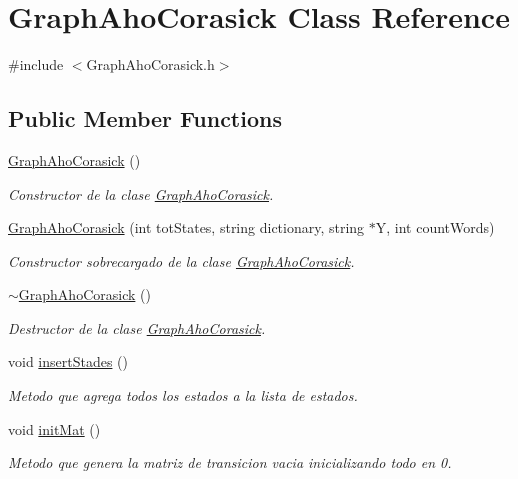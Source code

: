\hypertarget{class_graph_aho_corasick}{\section{Graph\+Aho\+Corasick Class Reference}
\label{class_graph_aho_corasick}
}


{\ttfamily \#include $<$Graph\+Aho\+Corasick.\+h$>$}

\subsection*{Public Member Functions}
\begin{DoxyCompactItemize}
\item 
\hyperlink{class_graph_aho_corasick_ac64b1bcc1a54abdd42a4d2411cd833c1}{Graph\+Aho\+Corasick} ()
\begin{DoxyCompactList}\small\item\em Constructor de la clase \hyperlink{class_graph_aho_corasick}{Graph\+Aho\+Corasick}. \end{DoxyCompactList}\item 
\hyperlink{class_graph_aho_corasick_af6b860fd718c8ca037eec6066b7d971e}{Graph\+Aho\+Corasick} (int tot\+States, string dictionary, string $\ast$Y, int count\+Words)
\begin{DoxyCompactList}\small\item\em Constructor sobrecargado de la clase \hyperlink{class_graph_aho_corasick}{Graph\+Aho\+Corasick}. \end{DoxyCompactList}\item 
\hyperlink{class_graph_aho_corasick_aec7b1cf7e492aa7fc9c0c46aa3347140}{$\sim$\+Graph\+Aho\+Corasick} ()
\begin{DoxyCompactList}\small\item\em Destructor de la clase \hyperlink{class_graph_aho_corasick}{Graph\+Aho\+Corasick}. \end{DoxyCompactList}\item 
void \hyperlink{class_graph_aho_corasick_aafe054daa541afbfb3859a464d97345c}{insert\+Stades} ()
\begin{DoxyCompactList}\small\item\em Metodo que agrega todos los estados a la lista de estados. \end{DoxyCompactList}\item 
void \hyperlink{class_graph_aho_corasick_a71f72fab03305b7c4ed56c57cc90d8f8}{init\+Mat} ()
\begin{DoxyCompactList}\small\item\em Metodo que genera la matriz de transicion vacia inicializando todo en 0. \end{DoxyCompactList}\item 

\end{DoxyCompactItemize}
